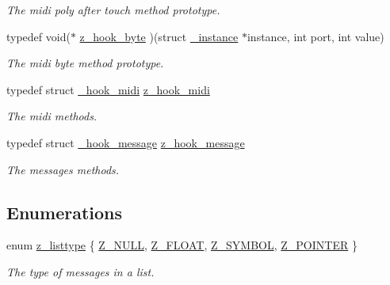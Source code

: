 \begin{DoxyCompactItemize}
\begin{DoxyCompactList}\small\item\em The midi poly after touch method prototype. \end{DoxyCompactList}\item 
\hypertarget{group__zpd_ga678844ef26377b42232a67a8ef560819}{typedef void($\ast$ \hyperlink{group__zpd_ga678844ef26377b42232a67a8ef560819}{z\-\_\-hook\-\_\-byte} )(struct \hyperlink{struct__instance}{\-\_\-instance} $\ast$instance, int port, int value)}\label{group__zpd_ga678844ef26377b42232a67a8ef560819}

\begin{DoxyCompactList}\small\item\em The midi byte method prototype. \end{DoxyCompactList}\item 
\hypertarget{group__zpd_ga70728a8fec2c25d440e780c38205cba7}{typedef struct \hyperlink{struct__hook__midi}{\-\_\-hook\-\_\-midi} \hyperlink{group__zpd_ga70728a8fec2c25d440e780c38205cba7}{z\-\_\-hook\-\_\-midi}}\label{group__zpd_ga70728a8fec2c25d440e780c38205cba7}

\begin{DoxyCompactList}\small\item\em The midi methods. \end{DoxyCompactList}\item 
\hypertarget{group__zpd_gad4b95d7399db12ebfe985f7a70a7a6a2}{typedef struct \hyperlink{struct__hook__message}{\-\_\-hook\-\_\-message} \hyperlink{group__zpd_gad4b95d7399db12ebfe985f7a70a7a6a2}{z\-\_\-hook\-\_\-message}}\label{group__zpd_gad4b95d7399db12ebfe985f7a70a7a6a2}

\begin{DoxyCompactList}\small\item\em The messages methods. \end{DoxyCompactList}\end{DoxyCompactItemize}
\subsection*{Enumerations}
\begin{DoxyCompactItemize}
\item 
enum \hyperlink{group__zpd_ga88e6eaf6d7bd0aed886cfc104e2c8c7c}{z\-\_\-listtype} \{ \hyperlink{group__zpd_gga88e6eaf6d7bd0aed886cfc104e2c8c7cae5da002759e430becefd742e535ce5f7}{Z\-\_\-\-N\-U\-L\-L}, 
\hyperlink{group__zpd_gga88e6eaf6d7bd0aed886cfc104e2c8c7ca42bfdb154a7a3104e60f574c876c1882}{Z\-\_\-\-F\-L\-O\-A\-T}, 
\hyperlink{group__zpd_gga88e6eaf6d7bd0aed886cfc104e2c8c7ca7fba727d1475526eac234b8778607ce6}{Z\-\_\-\-S\-Y\-M\-B\-O\-L}, 
\hyperlink{group__zpd_gga88e6eaf6d7bd0aed886cfc104e2c8c7cab80746afc21fdd99c5b4bce6a87cd5d3}{Z\-\_\-\-P\-O\-I\-N\-T\-E\-R}
 \}
\begin{DoxyCompactList}\small\item\em The type of messages in a list. \end{DoxyCompactList}\end{DoxyCompactItemize}
